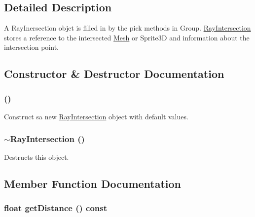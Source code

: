 \subsection{Detailed Description}
A RayInersection objet is filled in by the pick methods in Group. \hyperlink{classm3g_1_1RayIntersection}{RayIntersection} stores a reference to the intersected \hyperlink{classm3g_1_1Mesh}{Mesh} or Sprite3D and information about the intersection point. 

\subsection{Constructor \& Destructor Documentation}
\hypertarget{classm3g_1_1RayIntersection_242b33a79f98ed90ad5a36912d2a46d5}{
\subsubsection[{RayIntersection}]{ ()}}
\label{classm3g_1_1RayIntersection_242b33a79f98ed90ad5a36912d2a46d5}


Construct sa new \hyperlink{classm3g_1_1RayIntersection}{RayIntersection} object with default values. \hypertarget{classm3g_1_1RayIntersection_bf9eb45cc9ff31acd542bb0da1b46fe1}{
\subsubsection[{$\sim$RayIntersection}]{\setlength{\rightskip}{0pt plus 5cm}$\sim${\bf RayIntersection} ()}}
\label{classm3g_1_1RayIntersection_bf9eb45cc9ff31acd542bb0da1b46fe1}


Destructs this object. 

\subsection{Member Function Documentation}
\hypertarget{classm3g_1_1RayIntersection_f024301f51d2ef67cac50e3255a49612}{
\subsubsection[{getDistance}]{\setlength{\rightskip}{0pt plus 5cm}float getDistance () const}}
\label{classm3g_1_1RayIntersection_f024301f51d2ef67cac50e3255a49612}


